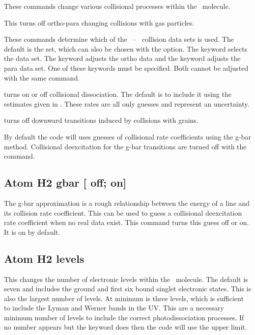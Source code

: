 These commands change various collisional processes within
the \htwo\ molecule.


This turns off
ortho-para changing
collisions with gas particles.



These commands determine which of the \htwo\ -- \htwo\ collision data
sets is used.
The default is the \citet{LeeH2H22008} set, which can also
be chosen with the  option.
The keyword  selects the
\citet{LeBourlot1999} data set.
The keyword  adjusts the ortho data and the
keyword  adjusts the para data set.
One of these keywords must be specified.  Both cannot be adjusted
with the same command.

turns on or off collisional dissociation.
The default is to include it using the estimates given in
\citet{Shaw2005}.
These rates are all only guesses and represent an
uncertainty.

 turns off downward
transitions induced by collisions with grains.

By default the code will uses guesses of collisional rate coefficients
using the g-bar method.
Collisional deexcitation for the g-bar transitions
are turned off with the  command.

\subsection{Atom H2 gbar [ off; on]}

The g-bar approximation is a rough relationship between the energy of
a line and its collision rate coefficient.  This can be used to guess a
collisional deexcitation rate coefficient when no real data exist.
This command turns this guess off or on.  It is on by default.

\subsection{Atom H2 levels }

This changes the number of electronic levels within the \htwo\ molecule.
The default is seven and includes the ground and first six bound singlet
electronic states.
This is also the largest number of levels.  At minimum
is three levels, which is sufficient to include the Lyman and Werner bands
in the UV.
This are a necessary minimum number of levels to include the
correct photodissociation processes.
If no number appears but the keyword
 does then the code will use the upper limit.

